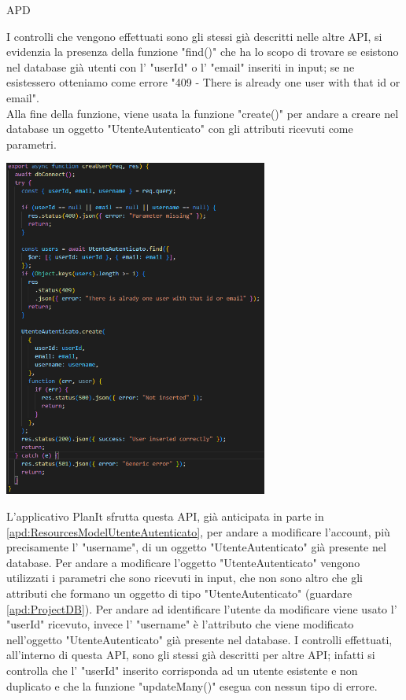 \begin{listaPersonale} {APD}
\begin{listaPersonale2}[APD]{}
                I controlli che vengono effettuati sono gli stessi già descritti nelle altre API, si evidenzia la presenza della funzione "find()" che ha lo scopo di trovare se esistono nel database già utenti con l' "userId" o l' "email" inseriti in input; se ne esistessero otteniamo come errore "409 - There is already one user with that id or email". \\
                Alla fine della funzione, viene usata la funzione "create()" per andare a creare nel database un oggetto "UtenteAutenticato" con gli attributi ricevuti come parametri.
                \begin{center}
                    \includegraphics[width=0.65\textwidth, height=0.55\textheight]{img/png/APIs/creaUser.png}
                \end{center}
                \newpage
                L'applicativo PlanIt sfrutta questa API, già anticipata in parte in \ref{apd:ResourcesModelUtenteAutenticato}, per andare a modificare l'account, più precisamente l' "username", di un oggetto "UtenteAutenticato" già presente nel database. Per andare a modificare l'oggetto "UtenteAutenticato" vengono utilizzati i parametri che sono ricevuti in input, che non sono altro che gli attributi che formano un oggetto di tipo "UtenteAutenticato" (guardare \ref{apd:ProjectDB}). Per andare ad identificare l'utente da modificare viene usato l' "userId" ricevuto, invece l' "username" è l'attributo che viene modificato nell'oggetto "UtenteAutenticato" già presente nel database. I controlli effettuati, all'interno di questa API, sono gli stessi già descritti per altre API; infatti si controlla che l' "userId" inserito corrisponda ad un utente esistente e non duplicato e che la funzione "updateMany()" esegua con nessun tipo di errore.

\end{listaPersonale2}
\end{listaPersonale}
